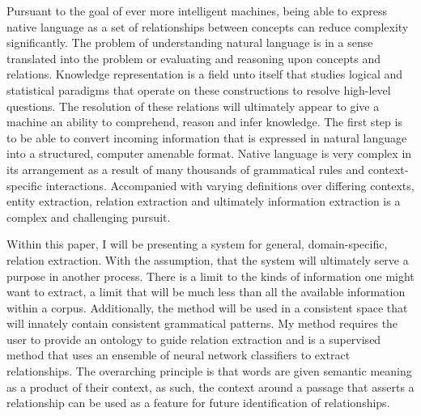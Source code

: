 \documentclass[11pt]{article} %
\begin{document}
Pursuant to the goal of ever more intelligent machines, being able to express native language as a set of relationships between concepts can reduce complexity significantly. The problem of understanding natural language is in a sense translated into the problem or evaluating and reasoning upon concepts and relations. Knowledge representation is a field unto itself that studies logical and statistical paradigms that operate on these constructions to resolve high-level questions. The resolution of these relations will ultimately appear to give a machine an ability to comprehend, reason and infer knowledge. The first step is to be able to convert incoming information that is expressed in natural language into a structured, computer amenable format. Native language is very complex in its arrangement as a result of many thousands of grammatical rules and context-specific interactions. Accompanied with varying definitions over differing contexts, entity extraction, relation extraction and ultimately information extraction is a complex and challenging pursuit. 

Within this paper, I will be presenting a system for general, domain-specific, relation extraction. With the assumption, that the system will ultimately serve a purpose in another process. There is a limit to the kinds of information one might want to extract, a limit that will be much less than all the available information within a corpus. Additionally, the method will be used in a consistent space that will innately contain consistent grammatical patterns. My method requires the user to provide an ontology to guide relation extraction and is a supervised method that uses an ensemble of neural network classifiers to extract relationships. The overarching principle is that words are given semantic meaning as a product of their context, as such, the context around a passage that asserts a relationship can be used as a feature for future identification of relationships.
\end{document}
